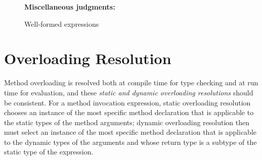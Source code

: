 \begin{figure}[t]
\flushleft\textbf{Miscellaneous judgments:}\par
\flushright
{}






\vspace*{-1.5em}
\caption{Well-formed expressions}
\label{fig:wellformedexpr}
\end{figure}

\section{Overloading Resolution}\label{sec:resolve}
Method overloading is resolved both at compile time for type checking
and at run time for evaluation, and these
\textit{static and dynamic overloading resolutions} should be consistent.
For a method invocation expression, static overloading resolution
chooses an instance of the most specific method declaration that is
applicable to the static types of the method arguments;
dynamic overloading resolution then must select an instance of the
most specific method declaration that is applicable to the dynamic types
of the arguments and whose return type is a subtype of the static type of
the expression.


